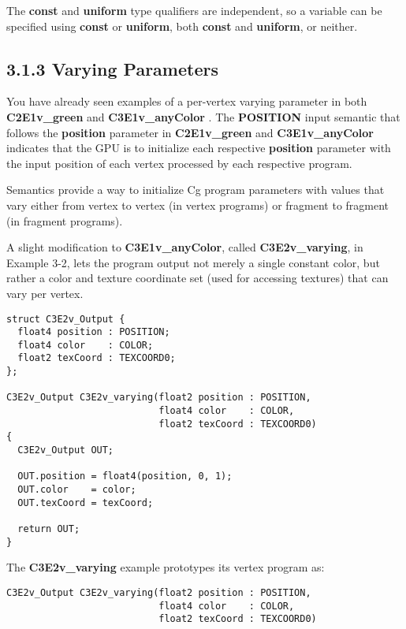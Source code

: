 \documentclass[../main.tex]{subfiles}
\begin{document}
The \textbf{const} and \textbf{uniform} type qualifiers are independent, so a variable can be specified using \textbf{const} or \textbf{uniform}, both \textbf{const} and \textbf{uniform}, or neither.

\subsection{3.1.3 Varying Parameters}

You have already seen examples of a per-vertex varying parameter in both \textbf{C2E1v_green} and \textbf{C3E1v_anyColor} . The \textbf{POSITION} input semantic that follows the \textbf{position} parameter in \textbf{C2E1v_green} and \textbf{C3E1v_anyColor} indicates that the GPU is to initialize each respective \textbf{position} parameter with the input position of each vertex processed by each respective program.

Semantics provide a way to initialize Cg program parameters with values that vary either from vertex to vertex (in vertex programs) or fragment to fragment (in fragment programs).

A slight modification to \textbf{C3E1v_anyColor}, called \textbf{C3E2v_varying}, in Example 3-2, lets the program output not merely a single constant color, but rather a color and texture coordinate set (used for accessing textures) that can vary per vertex.

\FloatBarrier
\begin{lstlisting}[caption=Example 3-2. The C3E2v_varying Vertex Program]
struct C3E2v_Output {
  float4 position : POSITION;
  float4 color    : COLOR;
  float2 texCoord : TEXCOORD0;
};

C3E2v_Output C3E2v_varying(float2 position : POSITION,
                           float4 color    : COLOR,
                           float2 texCoord : TEXCOORD0)
{
  C3E2v_Output OUT;

  OUT.position = float4(position, 0, 1);
  OUT.color    = color;
  OUT.texCoord = texCoord;

  return OUT;
}
\end{lstlisting}
\FloatBarrier

The \textbf{C3E2v_varying} example prototypes its vertex program as:

\FloatBarrier
\begin{lstlisting}
C3E2v_Output C3E2v_varying(float2 position : POSITION,
                           float4 color    : COLOR,
                           float2 texCoord : TEXCOORD0)
\end{lstlisting}
\FloatBarrier
\end{document}

